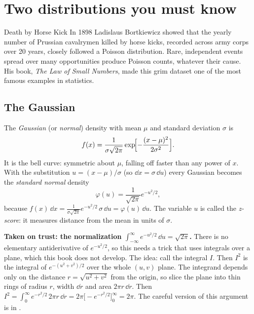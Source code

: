 \section{Two distributions you must know}\label{sec:probability-gauss-exp}
\begin{didyouknow}{Death by Horse Kick}
In 1898 Ladislaus Bortkiewicz showed that the yearly number of Prussian cavalrymen killed by horse kicks, recorded across army corps over 20 years, closely followed a Poisson distribution. Rare, independent events spread over many opportunities produce Poisson counts, whatever their cause. His book, \emph{The Law of Small Numbers}, made this grim dataset one of the most famous examples in statistics.
\end{didyouknow}

\subsection{The Gaussian}

The \emph{Gaussian} (or \emph{normal}) density with mean $\mu$ and standard deviation $\sigma$ is
\begin{equation}
f(x) = \frac{1}{\sigma\sqrt{2\pi}}\exp\!\Bigl[-\frac{(x-\mu)^2}{2\sigma^2}\Bigr].
\label{eq:probability-gauss}
\end{equation}
It is the bell curve: symmetric about $\mu$, falling off faster than any power of $x$. With the substitution $u=(x-\mu)/\sigma$ (so $\dd x=\sigma\,\dd u$) every Gaussian becomes the \emph{standard normal} density
\begin{equation}
\varphi(u) = \frac{1}{\sqrt{2\pi}}e^{-u^2/2},
\label{eq:probability-stdnormal}
\end{equation}
because $f(x)\,\dd x = \frac{1}{\sigma\sqrt{2\pi}}e^{-u^2/2}\,\sigma\,\dd u = \varphi(u)\,\dd u$. The variable $u$ is called the \emph{z-score}: it measures distance from the mean in units of $\sigma$.

\begin{beyond}
\textbf{Taken on trust: the normalization $\int_{-\infty}^{\infty}e^{-u^2/2}\,\dd u=\sqrt{2\pi}$.} There is no elementary antiderivative of $e^{-u^2/2}$, so this needs a trick that uses integrals over a plane, which this book does not develop. The idea: call the integral $I$. Then $I^2$ is the integral of $e^{-(u^2+v^2)/2}$ over the whole $(u,v)$ plane. The integrand depends only on the distance $r=\sqrt{u^2+v^2}$ from the origin, so slice the plane into thin rings of radius $r$, width $\dd r$ and area $2\pi r\,\dd r$. Then $I^2=\int_0^\infty e^{-r^2/2}\,2\pi r\,\dd r = 2\pi\bigl[-e^{-r^2/2}\bigr]_0^\infty=2\pi$. The careful version of this argument is in \cite{rhb}.
\end{beyond}

